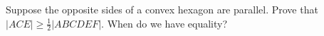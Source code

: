 Suppose the opposite sides of a convex hexagon are parallel. Prove that $|ACE| \geq \frac{1}{2}|ABCDEF|$. When do we have equality?
